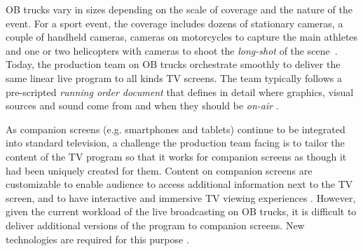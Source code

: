 \documentclass[sigchi-a, authorversion]{acmart}
\begin{document}
OB trucks vary in sizes depending on the scale of coverage and the nature of the
event. For a sport event, the coverage includes dozens of stationary cameras, a
couple of handheld cameras, cameras on motorcycles to capture the main athletes
and one or two helicopters with cameras to shoot the \emph{long-shot} of the
scene~\cite{owens2012, Li:2018_TVX}. Today, the production team on OB trucks
orchestrate smoothly to deliver the same linear live program to all kinds TV
screens. The team typically follows a pre-scripted \emph{running order document} that
defines in detail where graphics, visual sources and sound come from and when
they should be \emph{on-air} \cite{Li:2018_TVX}.

As companion screens (e.g. smartphones and tablets) continue to be integrated
into standard television, a challenge the production team facing is to tailor
the content of the TV program so that it works for companion screens as though
it had been uniquely created for them. Content on companion screens are
customizable to enable audience to access additional information next to the TV
screen, and to have interactive and immersive TV viewing
experiences \cite{bentley2017, dowell2015}. However, given the current workload
of the live broadcasting on OB trucks, it is difficult to deliver additional
versions of the program to companion screens. New technologies are required for
this purpose \cite{Li:2018_TVX, armstrong2014}.
\end{document}
